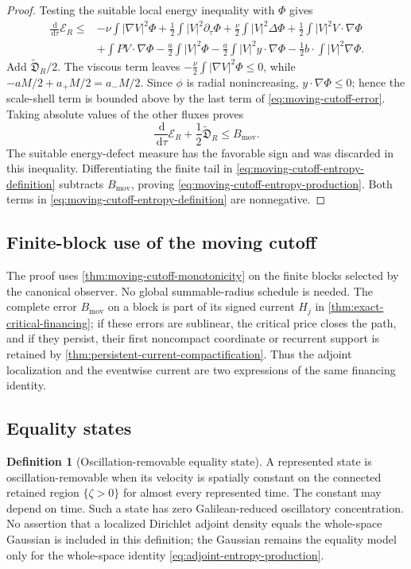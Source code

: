 \documentclass[11pt]{amsart}
\numberwithin{equation}{section}
\theoremstyle{plain}
\theoremstyle{definition}
\newtheorem{definition}[definition]{Definition}
\theoremstyle{remark}
\newcommand{\dd}{\,\mathrm d}
\begin{document}
\begin{proof}
Testing the suitable local energy inequality with \(\Phi\) gives
\begin{align*}
 \frac{\dd}{\dd\tau}\mathcal E_R
 \le{}&-\nu\int|\nabla V|^2\Phi
 +\frac12\int|V|^2\partial_\tau\Phi
 +\frac\nu2\int|V|^2\Delta\Phi
 +\frac12\int|V|^2V\cdot\nabla\Phi\\
 &+\int PV\cdot\nabla\Phi
 -\frac a2\int|V|^2\Phi
 -\frac a2\int|V|^2y\cdot\nabla\Phi
 -\frac12b\cdot\int|V|^2\nabla\Phi .
\end{align*}
Add \(\widetilde{\mathfrak D}_R/2\).  The viscous term leaves
\(-\frac\nu2\int|\nabla V|^2\Phi\le0\), while
\(-aM/2+a_+M/2=a_-M/2\).  Since \(\phi\) is radial nonincreasing,
\(y\cdot\nabla\Phi\le0\); hence the scale-shell term is bounded above by
the last term of \eqref{eq:moving-cutoff-error}.  Taking absolute values of
the other fluxes proves
\[
 \frac{\dd}{\dd\tau}\mathcal E_R
 +\frac12\widetilde{\mathfrak D}_R\le B_{\mathrm{mov}}.
\]
The suitable energy-defect measure has the favorable sign and was discarded
in this inequality.  Differentiating the finite tail in
\eqref{eq:moving-cutoff-entropy-definition} subtracts \(B_{\mathrm{mov}}\), proving
\eqref{eq:moving-cutoff-entropy-production}.  Both terms in
\eqref{eq:moving-cutoff-entropy-definition} are nonnegative.
\end{proof}

\subsection{Finite-block use of the moving cutoff}

The proof uses \cref{thm:moving-cutoff-monotonicity} on the finite blocks
selected by the canonical observer.  No global summable-radius schedule is
needed.  The complete error \(B_{\mathrm{mov}}\) on a block is part of its
signed current \(H_j\) in \cref{thm:exact-critical-financing}; if these errors
are sublinear, the critical price closes the path, and if they persist, their
first noncompact coordinate or recurrent support is retained by
\cref{thm:persistent-current-compactification}.  Thus the adjoint
localization and the eventwise current are two expressions of the same
financing identity.

\subsection{Equality states}

\begin{definition}[Oscillation-removable equality state]
\label{def:removable-equality-state}
A represented state is oscillation-removable when its velocity is spatially
constant on the connected retained region \(\{\zeta>0\}\) for almost every
represented time.  The constant may depend on time.  Such a state has zero
Galilean-reduced oscillatory concentration.  No assertion that a localized
Dirichlet adjoint density equals the whole-space Gaussian is included in this
definition; the Gaussian remains the equality model only for the
whole-space identity \eqref{eq:adjoint-entropy-production}.
\end{definition}
\end{document}
